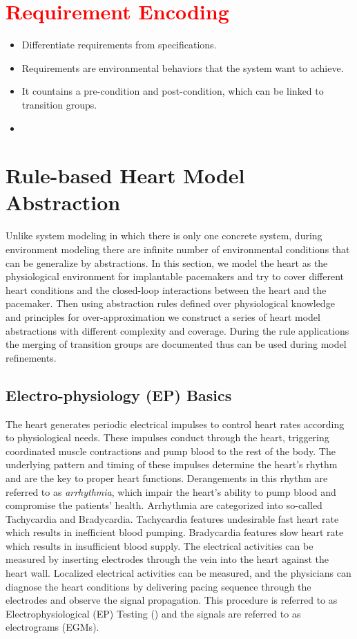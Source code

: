 \documentclass{llncs}
\begin{document}
\section{\textcolor{red}{Requirement Encoding}}
\begin{itemize}
	\item Differentiate requirements from specifications.
    \item Requirements are environmental behaviors that the system want to achieve.
    \item It countains a pre-condition and post-condition, which can be linked to transition groups.
    \item 
\end{itemize}



\section{Rule-based Heart Model Abstraction}

Unlike system modeling in which there is only one concrete system, during environment modeling there are infinite number of environmental conditions that can be generalize by abstractions. In this section, we model the heart as the physiological environment for implantable pacemakers and try to cover different heart conditions and the closed-loop interactions between the heart and the pacemaker. Then using abstraction rules defined over physiological knowledge and principles for over-approximation we construct a series of heart model abstractions with different complexity and coverage. During the rule applications the merging of transition groups are documented thus can be used during model refinements.
\subsection{Electro-physiology (EP) Basics}
The heart generates periodic electrical impulses to control heart rates according to physiological needs. These impulses conduct through the heart, triggering coordinated muscle contractions and pump blood to the rest of the body. The underlying pattern and timing of these impulses determine the heart's rhythm and are the key to proper heart functions. Derangements in this rhythm are referred to as \emph{arrhythmia}, which impair the heart's ability to pump blood and compromise the patients' health. Arrhythmia are categorized into so-called \textsf{Tachycardia} and \textsf{Bradycardia}. Tachycardia features undesirable fast heart rate which results in inefficient blood pumping. Bradycardia features slow heart rate which results in insufficient blood supply. The electrical activities can be measured by inserting electrodes through the vein into the heart against the heart wall. Localized electrical activities can be measured, and the physicians can diagnose the heart conditions by delivering pacing sequence through the electrodes and observe the signal propagation. This procedure is referred to as Electrophysiological (EP) Testing  (\cite{josephson}) and the signals are referred to as electrograms (EGMs).
\end{document}
